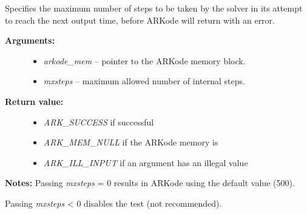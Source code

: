 \documentclass[letterpaper,10pt,english]{sphinxmanual}
\begin{document}
\begin{fulllineitems}
\label{c_interface/User_callable:ARKodeSetMaxNumSteps}
Specifies the maximum number of steps to be taken by the
solver in its attempt to reach the next output time, before ARKode
will return with an error.
\begin{description}
\item[{\textbf{Arguments:}}] \leavevmode\begin{itemize}
\item {} 
\emph{arkode\_mem} -- pointer to the ARKode memory block.

\item {} 
\emph{mxsteps} -- maximum allowed number of internal steps.

\end{itemize}

\item[{\textbf{Return value:}}] \leavevmode\begin{itemize}
\item {} 
\emph{ARK\_SUCCESS} if successful

\item {} 
\emph{ARK\_MEM\_NULL} if the ARKode memory is 

\item {} 
\emph{ARK\_ILL\_INPUT} if an argument has an illegal value

\end{itemize}

\end{description}

\textbf{Notes:} Passing \emph{mxsteps} = 0 results in ARKode using the
default value (500).

Passing \emph{mxsteps} \textless{} 0 disables the test (not recommended).

\end{fulllineitems}

\end{document}
